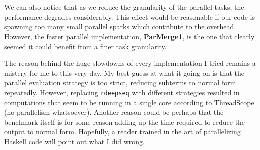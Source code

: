 \documentclass[a4paper,10pt]{article}
\begin{document}
{
~\hspace{-5pt}
}\\

We can also notice that as we reduce the granularity of the parallel tasks, the
performance degrades considerably.
%
This effect would be reasonable if our code is spawning too many small parallel
sparks which contribute to the overhead.
%
However, the faster parallel implementation, \textbf{ParMerge1}, is the one that
clearly seemed it could benefit from a finer task granularity.

The reason behind the huge slowdowns of every implementation I tried remains a
mistery for me to this very day.
%
My best guess at what it going on is that the parallel evaluation strategy is
too strict, reducing subterms to normal form repeatedly. However, replacing
\texttt{rdeepseq} with different strategies resulted in computations that seem
to be running in a single core according to ThreadScope (no parallelism
whatsoever).
%
Another reason could be perhaps that the benchmark itself is for some reason
adding up the time required to reduce the output to normal form.
%
Hopefully, a reader trained in the art of parallelizing Haskell code will point
out what I did wrong.
\end{document}
